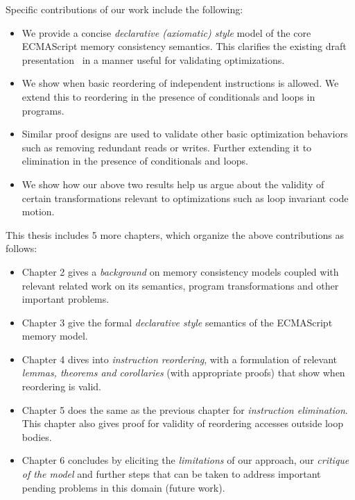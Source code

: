 Specific contributions of our work include the following:
\begin{itemize}
    \item We provide a concise \textit{declarative (axiomatic) style} model of the core ECMAScript memory consistency semantics. This clarifies the existing draft presentation~\cite{ECMA} in a manner useful for validating optimizations.
    \item We show when basic reordering of independent instructions is allowed. We extend this to reordering in the presence of conditionals and loops in programs.
    \item Similar proof designs are used to validate other basic optimization behaviors such as removing redundant reads or writes. Further extending it to elimination in the presence of conditionals and loops. 
    \item We show how our above two results help us argue about the validity of certain transformations relevant to optimizations such as loop invariant code motion. 
\end{itemize}

This thesis includes 5 more chapters, which organize the above contributions as follows:
\begin{itemize}
    \item Chapter 2 gives a \textit{background} on memory consistency models coupled with relevant related work on its semantics, program transformations and other important problems.
    \item Chapter 3 give the formal \textit{declarative style} semantics of the ECMAScript memory model.
    \item Chapter 4 dives into \textit{instruction reordering}, with a formulation of relevant \textit{lemmas, theorems and corollaries} (with appropriate proofs) that show when reordering is valid.
    \item Chapter 5 does the same as the previous chapter for \textit{instruction elimination}. This chapter also gives proof for validity of reordering accesses outside loop bodies. 
    \item Chapter 6 concludes by eliciting the \textit{limitations} of our approach, our \textit{critique of the model} and further steps that can be taken to address important pending problems in this domain (future work).
\end{itemize}